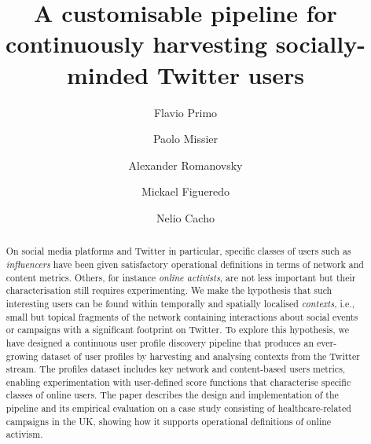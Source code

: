 \documentclass[runningheads]{llncs}
\begin{document}
%
\title{A customisable pipeline for continuously harvesting socially-minded Twitter users}
%
%
\author{Flavio Primo \and
Paolo Missier \and
Alexander Romanovsky \and
Mickael Figueredo \and
Nelio Cacho}

%
%
%
\maketitle       %
%


\begin{abstract}
	On social media platforms and Twitter in particular, specific classes of users such as \textit{influencers}  have been given satisfactory operational definitions in terms of  network and content metrics.
	Others, for instance \textit{online activists}, are not less important but their characterisation still requires experimenting.
   We make  the hypothesis that such interesting users can be found within temporally and spatially localised \textit{contexts}, i.e., small but topical fragments of the network containing interactions about social events or campaigns with a significant footprint on Twitter.
	To explore this hypothesis, we have designed a continuous user profile discovery pipeline that produces an ever-growing dataset of user profiles by harvesting and analysing contexts from the Twitter stream.
	The profiles dataset includes key network and content-based users metrics, enabling experimentation with user-defined score functions that characterise specific classes of online users.
    The paper describes the design and implementation of  the pipeline and its empirical evaluation on a case study consisting of healthcare-related campaigns in the UK, showing how it supports operational definitions of online activism.
	
\end{abstract}
%
\end{document}
